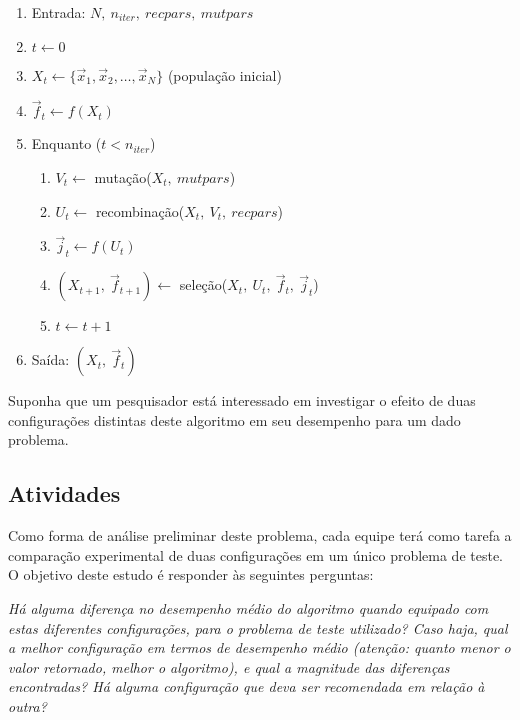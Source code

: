 \documentclass[11pt,twoside,printwatermark=false]{pinp}
\providecommand{\tightlist}{%
  \setlength{\itemsep}{0pt}\setlength{\parskip}{0pt}}
\begin{document}
\begin{enumerate}
\def\labelenumi{\arabic{enumi}.}
\setcounter{enumi}{-1}
\tightlist
\item
  Entrada: \(N,\ n_{iter},\ recpars,\ mutpars\)
\item
  \(t \leftarrow 0\)
\item
  \(X_t \leftarrow \{\vec{x}_1, \vec{x}_2, \ldots, \vec{x}_N\}\)
  (população inicial)
\item
  \(\vec{f}_t \leftarrow f(X_t)\)
\item
  Enquanto (\(t < n_{iter}\))

  \begin{enumerate}
  \def\labelenumii{\arabic{enumii}.}
  \tightlist
  \item
    \(V_t \leftarrow\) mutação(\(X_t,\ mutpars\))
  \item
    \(U_t \leftarrow\) recombinação(\(X_t,\ V_t,\ recpars\))
  \item
    \(\vec{j}_t \leftarrow f(U_t)\)
  \item
    \((X_{t+1},\ \vec{f}_{t+1}) \leftarrow\)
    seleção(\(X_t,\ U_t,\ \vec{f}_t,\ \vec{j}_t\))
  \item
    \(t \leftarrow t + 1\)
  \end{enumerate}
\item
  Saída: \((X_t,\ \vec{f}_t)\)
\end{enumerate}

Suponha que um pesquisador está interessado em investigar o efeito de
duas configurações distintas deste algoritmo em seu desempenho para um
dado problema.

\subsection{Atividades}\label{atividades}

Como forma de análise preliminar deste problema, cada equipe terá como
tarefa a comparação experimental de duas configurações em um único
problema de teste. O objetivo deste estudo é responder às seguintes
perguntas:

\begin{center}\textit{Há alguma diferença no desempenho médio do algoritmo quando equipado com estas diferentes configurações, para o problema de teste utilizado? Caso haja, qual a melhor configuração em termos de desempenho médio (atenção: quanto \textit{menor} o valor retornado, melhor o algoritmo), e qual a magnitude das diferenças encontradas? Há alguma configuração que deva ser recomendada em relação à outra?}\end{center}
\end{document}
